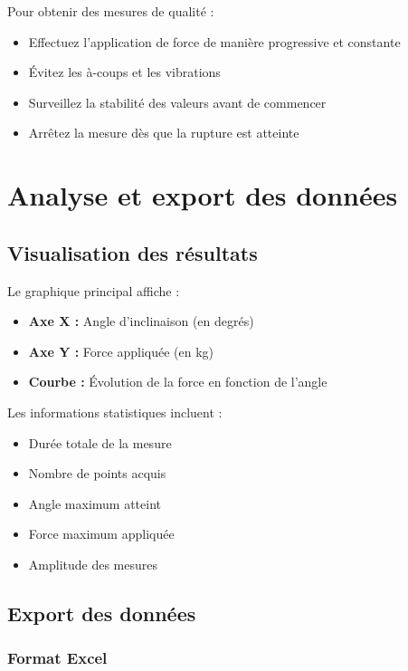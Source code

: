 \documentclass[12pt,a4paper]{article}
\begin{document}
Pour obtenir des mesures de qualité :
\begin{itemize}
    \item Effectuez l'application de force de manière progressive et constante
    \item Évitez les à-coups et les vibrations
    \item Surveillez la stabilité des valeurs avant de commencer
    \item Arrêtez la mesure dès que la rupture est atteinte
\end{itemize}

\section{Analyse et export des données}

\subsection{Visualisation des résultats}

Le graphique principal affiche :
\begin{itemize}
    \item \textbf{Axe X :} Angle d'inclinaison (en degrés)
    \item \textbf{Axe Y :} Force appliquée (en kg)
    \item \textbf{Courbe :} Évolution de la force en fonction de l'angle
\end{itemize}

Les informations statistiques incluent :
\begin{itemize}
    \item Durée totale de la mesure
    \item Nombre de points acquis
    \item Angle maximum atteint
    \item Force maximum appliquée
    \item Amplitude des mesures
\end{itemize}

\subsection{Export des données}

\subsubsection{Format Excel}
\end{document}
